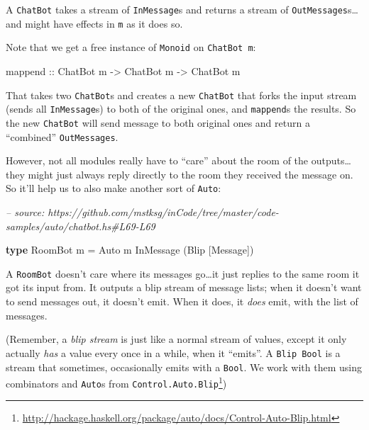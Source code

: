 \documentclass[]{article}
\newenvironment{Shaded}{}{}
\newcommand{\CommentTok}[1]{\textcolor[rgb]{0.38,0.63,0.69}{\textit{#1}}}
\newcommand{\DataTypeTok}[1]{\textcolor[rgb]{0.56,0.13,0.00}{#1}}
\newcommand{\FunctionTok}[1]{\textcolor[rgb]{0.02,0.16,0.49}{#1}}
\newcommand{\KeywordTok}[1]{\textcolor[rgb]{0.00,0.44,0.13}{\textbf{#1}}}
\newcommand{\NormalTok}[1]{#1}
\newcommand{\OtherTok}[1]{\textcolor[rgb]{0.00,0.44,0.13}{#1}}
\renewcommand{\href}[2]{#2\footnote{\url{#1}}}
\begin{document}
A \texttt{ChatBot} takes a stream of \texttt{InMessage}s and returns a stream of
\texttt{OutMessages}s\ldots{}and might have effects in \texttt{m} as it does so.

Note that we get a free instance of \texttt{Monoid} on \texttt{ChatBot\ m}:

\begin{Shaded}
\begin{Highlighting}[]
\NormalTok{mappend}\OtherTok{ ::} \DataTypeTok{ChatBot}\NormalTok{ m }\OtherTok{->} \DataTypeTok{ChatBot}\NormalTok{ m }\OtherTok{->} \DataTypeTok{ChatBot}\NormalTok{ m}
\end{Highlighting}
\end{Shaded}

That takes two \texttt{ChatBot}s and creates a new \texttt{ChatBot} that forks
the input stream (sends all \texttt{InMessage}s) to both of the original ones,
and \texttt{mappend}s the results. So the new \texttt{ChatBot} will send message
to both original ones and return a ``combined'' \texttt{OutMessages}.

However, not all modules really have to ``care'' about the room of the
outputs\ldots{}they might just always reply directly to the room they received
the message on. So it'll help us to also make another sort of \texttt{Auto}:

\begin{Shaded}
\begin{Highlighting}[]
\CommentTok{-- source: https://github.com/mstksg/inCode/tree/master/code-samples/auto/chatbot.hs#L69-L69}

\KeywordTok{type} \DataTypeTok{RoomBot}\NormalTok{ m }\FunctionTok{=} \DataTypeTok{Auto}\NormalTok{ m }\DataTypeTok{InMessage}\NormalTok{ (}\DataTypeTok{Blip}\NormalTok{ [}\DataTypeTok{Message}\NormalTok{])}
\end{Highlighting}
\end{Shaded}

A \texttt{RoomBot} doesn't care where its messages go\ldots{}it just replies to
the same room it got its input from. It outputs a blip stream of message lists;
when it doesn't want to send messages out, it doesn't emit. When it does, it
\emph{does} emit, with the list of messages.

(Remember, a \emph{blip stream} is just like a normal stream of values, except
it only actually \emph{has} a value every once in a while, when it ``emits''. A
\texttt{Blip\ Bool} is a stream that sometimes, occasionally emits with a
\texttt{Bool}. We work with them using combinators and \texttt{Auto}s from
\href{http://hackage.haskell.org/package/auto/docs/Control-Auto-Blip.html}{\texttt{Control.Auto.Blip}})
\end{document}
